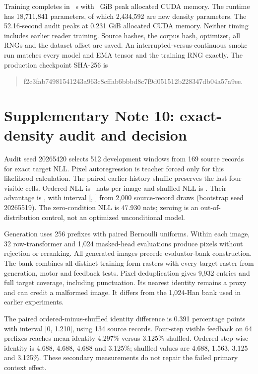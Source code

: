 \documentclass[10pt,a4paper]{article}
\begin{document}
Training completes in \DensitySeconds\ s with \DensityMemory\ GiB peak allocated
CUDA memory. The runtime has 18,711,841 parameters, of which 2,434,592 are
new density parameters. The 52.16-second audit peaks at 0.231 GiB allocated
CUDA memory. Neither timing includes earlier reader training. Source hashes,
the corpus hash, optimizer, all RNGs and the dataset offset are saved. An
interrupted-versus-continuous smoke run matches every model and EMA tensor and
the training RNG exactly. The production checkpoint SHA-256 is
\begin{quote}\small\ttfamily
f2c3fab74981541243a963c8cffab6bbbd8c7f9d051512b228347db04a57a9ee.
\end{quote}

\section*{Supplementary Note 10: exact-density audit and decision}
Audit seed 20265420 selects 512 development windows from 169 source records
for exact target NLL. Pixel autoregression is teacher forced only for this
likelihood calculation. The paired earlier-history shuffle preserves the last
four visible cells. Ordered NLL is \DensityNll\ nats per image and shuffled
NLL is \DensityShuffledNll. Their advantage is \DensityAdvantage, with interval
[\DensityLow, \DensityHigh] from 2,000 source-record draws (bootstrap seed
20265519). The zero-condition NLL is 47.930 nats; zeroing is an
out-of-distribution control, not an optimized unconditional model.

Generation uses 256 prefixes with paired Bernoulli uniforms. Within each
image, 32 row-transformer and 1,024 masked-head evaluations produce pixels
without rejection or reranking. All generated images precede evaluator-bank
construction. The bank combines all distinct training-form rasters with every
target raster from generation, motor and feedback tests. Pixel deduplication
gives 9,932 entries and full target coverage, including punctuation. Its
nearest identity remains a proxy and can credit a malformed image. It differs
from the 1,024-Han bank used in earlier experiments.



The paired ordered-minus-shuffled identity difference is 0.391 percentage
points with interval [0, 1.210], using 134 source records. Four-step visible
feedback on 64 prefixes reaches mean identity 4.297\% versus 3.125\% shuffled.
Ordered step-wise identity is 4.688, 4.688, 4.688 and 3.125\%; shuffled values
are 4.688, 1.563, 3.125 and 3.125\%. These secondary measurements do not
repair the failed primary context effect.
\end{document}
